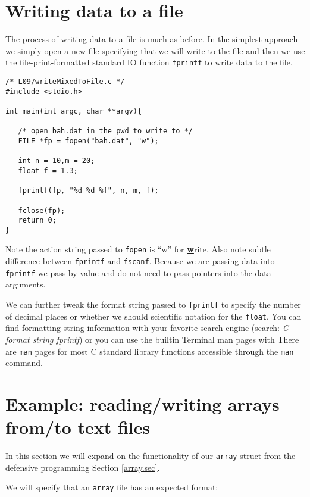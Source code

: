 \section{Writing data to a file}

The process of writing data to a file is much as before. In the simplest approach we simply open a new file specifying that we will write to the file and then we use the file-print-formatted standard IO function \texttt{fprintf} to write data to the file.

\begin{verbatim}
/* L09/writeMixedToFile.c */
#include <stdio.h>

int main(int argc, char **argv){
  
   /* open bah.dat in the pwd to write to */
   FILE *fp = fopen("bah.dat", "w");
   
   int n = 10,m = 20;
   float f = 1.3;

   fprintf(fp, "%d %d %f", n, m, f);
   
   fclose(fp);
   return 0;
}
\end{verbatim}
Note the action string passed to \texttt{fopen} is ``w'' for \underline{\bf w}rite. Also note subtle difference between \texttt{fprintf} and \texttt{fscanf}. Because we are passing data into \texttt{fprintf} we pass by value and do not need to pass pointers into the data arguments.

We can further tweak the format string passed to \texttt{fprintf} to specify the number of decimal places or whether we should scientific notation for the \texttt{float}. You can find formatting string information with your favorite search engine (search: \emph{C format string fprintf}) or you can use the builtin Terminal man pages with 
There are \texttt{man} pages for most C standard library functions accessible through the \texttt{man} command.

\section{Example: reading/writing arrays from/to text files}

In this section we will expand on the functionality of our \texttt{array} struct from the defensive programming  Section \ref{array.sec}.

We will specify that an \texttt{array} file has an expected format:

